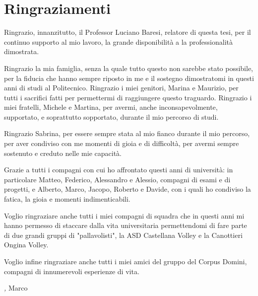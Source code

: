 %
%
\cleardoublepage
%
%
%
\chapter*{Ringraziamenti}
%
\par Ringrazio, innanzitutto, il Professor Luciano Baresi, relatore di questa tesi, per il continuo supporto al mio lavoro, la grande disponibilità a la professionalità dimostrata.\\
\par Ringrazio la mia famiglia, senza la quale tutto questo non sarebbe stato possibile, per la fiducia che hanno sempre riposto in me e il sostegno dimostratomi in questi anni di studi al Politecnico. Ringrazio i miei genitori, Marina e Maurizio, per tutti i sacrifici fatti per permettermi di raggiungere questo traguardo. Ringrazio i miei fratelli, Michele e Martina, per avermi, anche inconsapevolmente, supportato, e soprattutto sopportato, durante il mio percorso di studi.\\
\par Ringrazio Sabrina, per essere sempre stata al mio fianco durante il mio percorso, per aver condiviso con me momenti di gioia e di difficoltà, per avermi sempre sostenuto e creduto nelle mie capacità.\\
\par Grazie a tutti i compagni con cui ho affrontato questi anni di università: in particolare Matteo, Federico, Alessandro e Alessio, compagni di esami e di progetti, e Alberto, Marco, Jacopo, Roberto e Davide, con i quali ho condiviso la fatica, la gioia e momenti indimenticabili.\\
\par Voglio ringraziare anche tutti i miei compagni di squadra che in questi anni mi hanno permesso di staccare dalla vita universitaria permettendomi di fare parte di due grandi gruppi di "pallavolisti", la ASD Castellana Volley e la Canottieri Ongina Volley.\\
\par Voglio infine ringraziare anche tutti i miei amici del gruppo del Corpus Domini, compagni di innumerevoli esperienze di vita.


\bigskip
\bigskip
\bigskip
\bigskip
\bigskip
\bigskip
\bigskip
\bigskip
\bigskip
\bigskip
 
\noindent\textit{\myLocation, \myTime}
\hfill Marco
%
